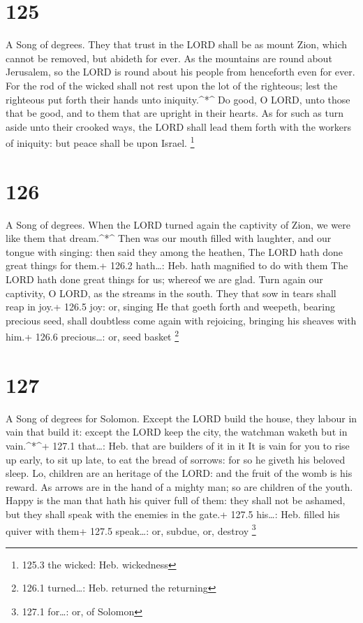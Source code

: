 \hypertarget{section-125}{%
\section{125}\label{section-125}}

A Song of degrees.  They that trust in the LORD shall be as
mount Zion, which cannot be removed, but abideth for ever. 
As the mountains are round about Jerusalem, so the LORD is round about
his people from henceforth even for ever.  For the rod of
the wicked shall not rest upon the lot of the righteous; lest the
righteous put forth their hands unto iniquity.\^{}*\^{}  Do
good, O LORD, unto those that be good, and to them that are upright in
their hearts.  As for such as turn aside unto their crooked
ways, the LORD shall lead them forth with the workers of iniquity: but
peace shall be upon Israel. \footnote{125.3 the wicked: Heb. wickedness}

\hypertarget{section-126}{%
\section{126}\label{section-126}}

A Song of degrees.  When the LORD turned again the captivity
of Zion, we were like them that dream.\^{}*\^{}  Then was
our mouth filled with laughter, and our tongue with singing: then said
they among the heathen, The LORD hath done great things for them.+ 126.2
hath\ldots: Heb. hath magnified to do with them  The LORD
hath done great things for us; whereof we are glad.  Turn
again our captivity, O LORD, as the streams in the south. 
They that sow in tears shall reap in joy.+ 126.5 joy: or, singing
 He that goeth forth and weepeth, bearing precious seed,
shall doubtless come again with rejoicing, bringing his sheaves with
him.+ 126.6 precious\ldots: or, seed basket \footnote{126.1
  turned\ldots: Heb. returned the returning}

\hypertarget{section-127}{%
\section{127}\label{section-127}}

A Song of degrees for Solomon.  Except the LORD build the
house, they labour in vain that build it: except the LORD keep the city,
the watchman waketh but in vain.\^{}*\^{}+ 127.1 that\ldots: Heb. that
are builders of it in it  It is vain for you to rise up
early, to sit up late, to eat the bread of sorrows: for so he giveth his
beloved sleep.  Lo, children are an heritage of the LORD:
and the fruit of the womb is his reward.  As arrows are in
the hand of a mighty man; so are children of the youth. 
Happy is the man that hath his quiver full of them: they shall not be
ashamed, but they shall speak with the enemies in the gate.+ 127.5
his\ldots: Heb. filled his quiver with them+ 127.5 speak\ldots: or,
subdue, or, destroy \footnote{127.1 for\ldots: or, of Solomon}

